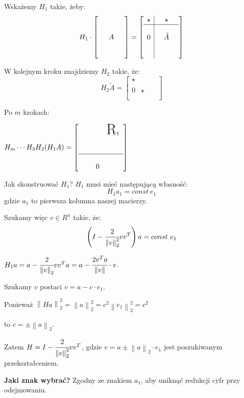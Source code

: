\documentclass[hidelinks,a4paper,fleqn,oneside]{book}
\newcommand{\norm}[1]{\left\lVert#1\right\rVert}
\begin{document}
Wskażemy $H_1$ takie, żeby:
\[
H_1 \cdot \left[ \begin{array}{c}\\ \\ \quad A \quad \\ \\ \ \end{array} \right] = 
\left[ \begin{array}{c|c}\star & \quad \star \quad \\ \hline \\ 0 & \tilde{A}\\ & \\ & \end{array}\right]
\]

W kolejnym kroku znajdziemy $H_2$ takie, że:
\[
H_2 \tilde{A} = \left[ \begin{array}{c|c}\star & \quad  \quad \\  \\ 0 & \star \\ & \\ & \end{array}\right]
\]

Po $m$ krokach:

$H_m \cdots H_3 H_2 (H_1 A) = \left[ \begin{array}{ccc} & & \text{\huge R}_1 \\ \\ \\ \hline \\ & \quad 0 & \end{array}\right]$

Jak skonstruować $H_1$? $H_1$ musi mieć następującą własność:
\[
	H_1 a_1 = const\ e_1
\]
gdzie $a_1$ to pierwsza kolumna naszej macierzy.

Szukamy więc $v \in R^n$ takie, że:
\[
	\left(I - \cfrac{2}{\norm{v}_2^2} vv^T\right)a = const\ e_1
\]

$H_1a = a - \cfrac{2}{\norm{v}_2} v v^Ta = a - \cfrac{2v^Ta}{\norm{v}} \cdot v$.

Szukamy $v$ postaci $v = a - c\cdot e_1$.

Ponieważ $\norm{Ha}_2^2 = \norm{a}^2_2 = c^2 \norm{e_1}^2_2 = c^2$

to $c = \pm \norm{a} _2$.


Zatem $H = I - \cfrac{2}{\norm{v}_2^2} vv^T$, gdzie $v = a \pm \norm{a}_2 \cdot e_1$ jest poszukiwanym przekształceniem.

\textbf{Jaki znak wybrać?} Zgodny ze znakiem $a_1$, aby uniknąć redukcji cyfr przy odejmowaniu.
\end{document}

